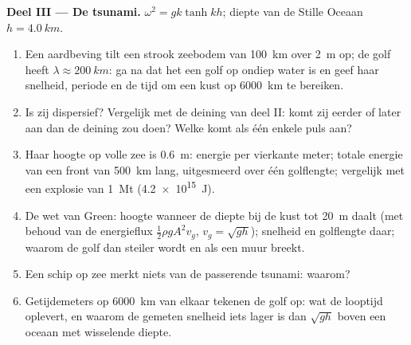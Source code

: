 \begin{problem}
\medskip
\noindent\textbf{Deel III --- De tsunami.}
$\omega^2 = gk\tanh kh$; diepte van de Stille Oceaan $h = \qty{4.0}{km}$.
\begin{enumerate}[resume]
  \item Een aardbeving tilt een strook zeebodem van \qty{100}{km} over
        \qty{2}{m} op; de golf heeft $\lambda \approx \qty{200}{km}$: ga na
        dat het een golf op ondiep water is en geef haar snelheid, periode
        en de tijd om een kust op \qty{6000}{km} te bereiken.
  \item Is zij dispersief? Vergelijk met de deining van deel II: komt zij
        eerder of later aan dan de deining zou doen? Welke komt als één
        enkele puls aan?
  \item Haar hoogte op volle zee is \qty{0.6}{m}: energie per vierkante
        meter; totale energie van een front van \qty{500}{km} lang,
        uitgesmeerd over één golflengte; vergelijk met een explosie van
        \qty{1}{Mt} (\qty{4.2e15}{J}).
  \item De wet van Green: hoogte wanneer de diepte bij de kust tot
        \qty{20}{m} daalt (met behoud van de energieflux
        $\tfrac12\rho gA^2v_g$, $v_g = \sqrt{gh}$); snelheid en golflengte
        daar; waarom de golf dan steiler wordt en als een muur breekt.
  \item Een schip op zee merkt niets van de passerende tsunami: waarom?
  \item Getijdemeters op \qty{6000}{km} van elkaar tekenen de golf op: wat
        de looptijd oplevert, en waarom de gemeten snelheid iets lager is
        dan $\sqrt{gh}$ boven een oceaan met wisselende diepte.
\end{enumerate}


\end{problem}
